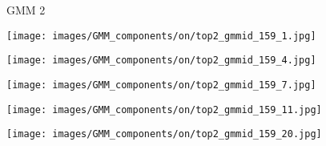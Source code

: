\documentclass[10pt,twocolumn,letterpaper]{article}
\begin{document}
\begin{figure*}[t]
    \begin{minipage}[b]{0.005\textwidth}
    	\centering
    	\begin{turn}{90}
    GMM 2
    	\end{turn}
    	\vspace{2.5ex}
    \end{minipage}
    \hspace{0.01\textwidth}
    \begin{minipage}[b]{0.18\textwidth}
    	\centering
       	\texttt{[image: images/GMM\_components/on/top2\_gmmid\_159\_1.jpg]}
    \end{minipage}
    \hspace{0.005\textwidth}
    \begin{minipage}[b]{0.18\textwidth}
    	\centering
       	\texttt{[image: images/GMM\_components/on/top2\_gmmid\_159\_4.jpg]}
    \end{minipage}
    \hspace{0.005\textwidth}
    \begin{minipage}[b]{0.18\textwidth}
    	\centering
       	\texttt{[image: images/GMM\_components/on/top2\_gmmid\_159\_7.jpg]}
    \end{minipage}
    \hspace{0.005\textwidth}
	\begin{minipage}[b]{0.18\textwidth}
    	\centering
       	\texttt{[image: images/GMM\_components/on/top2\_gmmid\_159\_11.jpg]}
    \end{minipage}
    \hspace{0.005\textwidth}
    \begin{minipage}[b]{0.18\textwidth}
    	\centering
       	\texttt{[image: images/GMM\_components/on/top2\_gmmid\_159\_20.jpg]}
    \end{minipage}     
    

\end{figure*}
\end{document}
